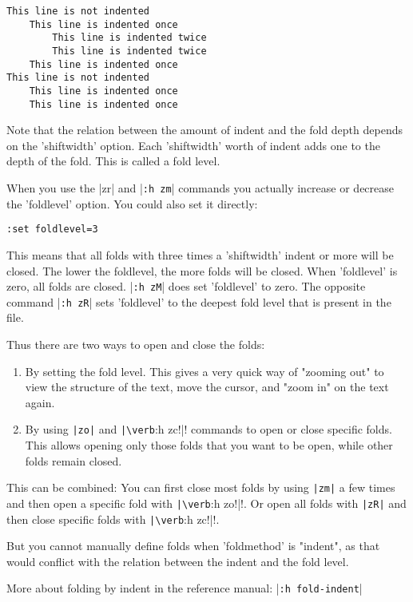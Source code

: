 \begin{Verbatim}[samepage=true]
This line is not indented
    This line is indented once
        This line is indented twice
        This line is indented twice
    This line is indented once
This line is not indented
    This line is indented once
    This line is indented once
\end{Verbatim}

Note that the relation between the amount of indent and the fold depth depends on the 'shiftwidth' option.
Each 'shiftwidth' worth of indent adds one to the depth of the fold.
This is called a fold level.

When you use the |zr| and |\verb!:h zm!| commands you actually increase or decrease the 'foldlevel' option.
You could also set it directly:

\begin{Verbatim}[samepage=true]
 :set foldlevel=3
\end{Verbatim}

This means that all folds with three times a 'shiftwidth' indent or more will be closed.
The lower the foldlevel, the more folds will be closed.
When 'foldlevel' is zero, all folds are closed.
|\verb!:h zM!| does set 'foldlevel' to zero.
The opposite command |\verb!:h zR!| sets 'foldlevel' to the deepest fold level that is present in the file.

Thus there are two ways to open and close the folds:
\begin{enumerate}
\item By setting the fold level.
This gives a very quick way of "zooming out" to view the structure of the text, move the cursor, and "zoom in" on the text again.

\item By using \verb!|zo|! and \verb!|\verb!:h zc!|! commands to open or close specific folds.
This allows opening only those folds that you want to be open, while other folds remain closed.
\end{enumerate}

This can be combined: You can first close most folds by using \verb!|zm|! a few times and then open a specific fold with \verb!|\verb!:h zo!|!.
Or open all folds with \verb!|zR|! and then close specific folds with \verb!|\verb!:h zc!|!.

But you cannot manually define folds when 'foldmethod' is "indent", as that would conflict with the relation between the indent and the fold level.

More about folding by indent in the reference manual: |\verb!:h fold-indent!|
